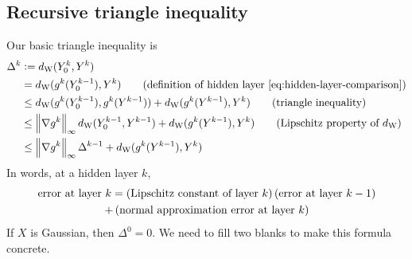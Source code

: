 \documentclass[oneside, article]{memoir}
\begin{document}
\subsection{Recursive triangle inequality}
Our basic triangle inequality is
\begin{align}
  \Delta^k &:= d_\mathrm{W}(Y_0^k, Y^k) 
  \label{eq:discrepancy}
  \\
  &= d_\mathrm{W}(g^k(Y_0^{k-1}), Y^k)
  \tag{definition of hidden layer \eqref{eq:hidden-layer-comparison}}
  \\
  &\leq d_\mathrm{W}(g^k(Y_0^{k-1}), g^k(Y^{k-1})) + d_\mathrm{W}(g^k(Y^{k-1}), Y^k)
  \tag{triangle inequality}
  \\
  &\leq \left\|\nabla g^k\right\|_\infty d_\mathrm{W}(Y_0^{k-1}, Y^{k-1}) + d_\mathrm{W}(g^k(Y^{k-1}), Y^k)
  \tag{Lipschitz property of \(d_\mathrm{W}\)}
  \\
  &\leq \left\|\nabla g^k\right\|_\infty \Delta^{k-1} + d_\mathrm{W}(g^k(Y^{k-1}), Y^k)
  \label{eq:discrepancy-recursion}
\end{align}
In words, at a hidden layer \(k\),
\begin{multline}
  \text{error at layer \(k\)}
  = \del{\text{Lipschitz constant of layer \(k\)}} \del{\text{error at layer \(k-1\)}} 
  \\
  + \del{\text{normal approximation error at layer \(k\)}}  
\end{multline}
If \(X\) is Gaussian, then \(\Delta^0 = 0\).
We need to fill two blanks to make this formula concrete.
\end{document}
